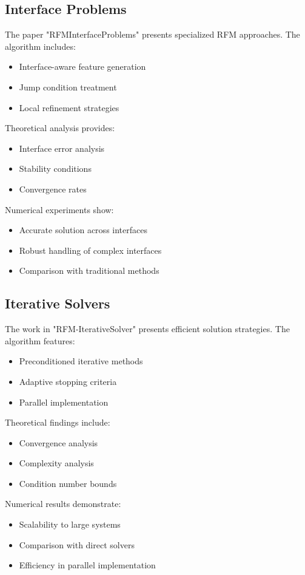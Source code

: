\documentclass[12pt]{article}
\begin{document}
\subsection{Interface Problems}
\label{subsec:rfm_interface}
The paper "RFMInterfaceProblems" presents specialized RFM approaches. The algorithm includes:
\begin{itemize}
    \item Interface-aware feature generation
    \item Jump condition treatment
    \item Local refinement strategies
\end{itemize}
Theoretical analysis provides:
\begin{itemize}
    \item Interface error analysis
    \item Stability conditions
    \item Convergence rates
\end{itemize}
Numerical experiments show:
\begin{itemize}
    \item Accurate solution across interfaces
    \item Robust handling of complex interfaces
    \item Comparison with traditional methods
\end{itemize}

\subsection{Iterative Solvers}
\label{subsec:rfm_iterative}
The work in "RFM-IterativeSolver" presents efficient solution strategies. The algorithm features:
\begin{itemize}
    \item Preconditioned iterative methods
    \item Adaptive stopping criteria
    \item Parallel implementation
\end{itemize}
Theoretical findings include:
\begin{itemize}
    \item Convergence analysis
    \item Complexity analysis
    \item Condition number bounds
\end{itemize}
Numerical results demonstrate:
\begin{itemize}
    \item Scalability to large systems
    \item Comparison with direct solvers
    \item Efficiency in parallel implementation
\end{itemize}
\end{document}
